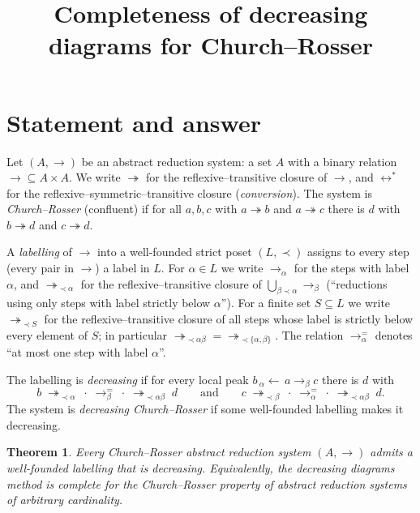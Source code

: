 \documentclass{amsart}
\newtheorem{theorem}{Theorem}
\theoremstyle{definition}
\theoremstyle{remark}
\newcommand{\redto}{\rightarrow}
\newcommand{\redtt}{\twoheadrightarrow}
\newcommand{\conv}{\leftrightarrow^{*}}
\begin{document}
\title{Completeness of decreasing diagrams for Church--Rosser}
\maketitle

\section{Statement and answer}

Let $(A,\redto)$ be an abstract reduction system: a set $A$ with a binary
relation ${\redto}\subseteq A\times A$.  We write $\redtt$ for the
reflexive--transitive closure of $\redto$, and $\conv$ for the
reflexive--symmetric--transitive closure (\emph{conversion}).  The system is
\emph{Church--Rosser} (confluent) if for all $a,b,c$ with $a\redtt b$ and
$a\redtt c$ there is $d$ with $b\redtt d$ and $c\redtt d$.

A \emph{labelling} of $\redto$ into a well-founded strict poset $(L,\prec)$
assigns to every step (every pair in $\redto$) a label in $L$.  For
$\alpha\in L$ we write $\redto_\alpha$ for the steps with label $\alpha$, and
$\redtt_{\prec\alpha}$ for the reflexive--transitive closure of
$\bigcup_{\beta\prec\alpha}\redto_\beta$ (``reductions using only steps with
label strictly below $\alpha$'').  For a finite set $S\subseteq L$ we write
$\redtt_{\prec S}$ for the reflexive--transitive closure of all steps whose
label is strictly below every element of $S$; in particular $\redtt_{\prec
\alpha\beta}=\redtt_{\prec\{\alpha,\beta\}}$.  The relation $\redto^{=}_\alpha$
denotes ``at most one step with label $\alpha$''.

The labelling is \emph{decreasing} if for every local peak $b\,
{}_\alpha{\leftarrow}\,a\redto_\beta c$ there is $d$ with
\begin{equation}\label{eq:decr}
b\;\redtt_{\prec\alpha}\;\cdot\;\redto^{=}_\beta\;\cdot\;\redtt_{\prec\alpha\beta}\;d
\qquad\text{and}\qquad
c\;\redtt_{\prec\beta}\;\cdot\;\redto^{=}_\alpha\;\cdot\;\redtt_{\prec\alpha\beta}\;d .
\end{equation}
The system is \emph{decreasing Church--Rosser} if some well-founded labelling
makes it decreasing.

\begin{theorem}\label{thm:main}
Every Church--Rosser abstract reduction system $(A,\redto)$ admits a
well-founded labelling that is decreasing.  Equivalently, the decreasing
diagrams method is complete for the Church--Rosser property of abstract
reduction systems of arbitrary cardinality.
\end{theorem}
\end{document}
